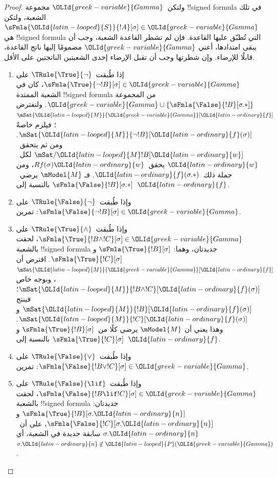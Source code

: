 \documentclass[../../../include/open-logic-section]{subfiles}
\begin{document}
\begin{proof}
ولتكن~$\OLId{greek-variable}{Gamma}$ مجموعة !!{signed formula} في تلك الشعبة، ولتكن
$\sFmla{\OLId{latin-looped}{S}}{!A}[\sigma] \in \OLId{greek-variable}{Gamma}$ هي !!{signed formula} التي تُطبّق
عليها القاعدة. فإن لم تشطر القاعدة الشعبة، وجب أن يبقى امتدادها، أعني
$\OLId{greek-variable}{Gamma}$ مضمومًا إليها ناتج القاعدة، قابلًا للإرضاء. وإن شطرتها وجب أن
تقبل الإرضاء إحدى الشعبتين الناتجتين على الأقل.
\begin{enumerate}
\item إذا طُبقت~$\TRule{\True}{\lnot}$ على
  $\sFmla{\True}{\lnot !B}[\sigma] \in \OLId{greek-variable}{Gamma}$، كان في الشعبة
  الممتدة !!{signed formula} من المجموعة
  $\OLId{greek-variable}{Gamma} \cup \{\sFmla{\False}{!B}[\sigma.{*}]\}$. ولنفترض
  $\mSat{\OLId{latin-looped}{M}}{\OLId{greek-variable}{Gamma}}[\OLId{latin-ordinary}{f}]$؛ فيلزم خاصةً
  $\mSat{\OLId{latin-looped}{M}}{\lnot !B}[\OLId{latin-ordinary}{f}(\sigma)]$. ومن ثم يتحقق~$\mSat/{\OLId{latin-looped}{M}}{!B}[\OLId{latin-ordinary}{w}]$
  لكل~$\OLId{latin-ordinary}{w}$ يحقق~$Rf(\sigma)\OLId{latin-ordinary}{w}$، ومن جملة ذلك~$\OLId{latin-ordinary}{f}(\sigma.{*})$. فـ
  $\mModel{M}$ يرضي~$\sFmla{\False}{!B}[\sigma.{*}]$ بالنسبة إلى~$\OLId{latin-ordinary}{f}$.
\item وإذا طُبقت~$\TRule{\False}{\lnot}$ على
  $\sFmla{\False}{\lnot !B}[\sigma] \in \OLId{greek-variable}{Gamma}$: تمرين.
\item وإذا طُبقت~$\TRule{\True}{\land}$ على
  $\sFmla{\True}{!B \land !C}[\sigma] \in \OLId{greek-variable}{Gamma}$، لحقت بالشعبة
  !!{signed formula} جديدتان، وهما:
  $\sFmla{\True}{!B}[\sigma]$ و$\sFmla{\True}{!C}[\sigma]$. افترض أن
  $\mSat{\OLId{latin-looped}{M}}{\OLId{greek-variable}{Gamma}}[\OLId{latin-ordinary}{f}]$، وبوجه خاص
  $\mSat{\OLId{latin-looped}{M}}{!B \land !C}[\OLId{latin-ordinary}{f}(\sigma)]$؛ فينتج
  $\mSat{\OLId{latin-looped}{M}}{!B}[\OLId{latin-ordinary}{f}(\sigma)]$ و$\mSat{\OLId{latin-looped}{M}}{!C}[\OLId{latin-ordinary}{f}(\sigma)]$. وهذا يعني أن
  $\mModel{M}$ يرضي كلًا من~$\sFmla{\True}{!B}[\sigma]$
  و$\sFmla{\True}{!C}[\sigma]$ بالنسبة إلى~$\OLId{latin-ordinary}{f}$.
\item وإذا طُبقت~$\TRule{\False}{\lor}$ على
  $\sFmla{\False}{!B \lor !C}[\sigma] \in \OLId{greek-variable}{Gamma}$: تمرين.
\item وإذا طُبقت~$\TRule{\False}{\lif}$ على
  $\sFmla{\False}{!B \lif !C}[\sigma] \in \OLId{greek-variable}{Gamma}$، لحقت بالشعبة
  !!{signed formula} جديدتان:
  $\sFmla{\True}{!B}[\sigma.\OLId{latin-ordinary}{n}]$ و$\sFmla{\False}{!C}[\sigma.\OLId{latin-ordinary}{n}]$،
  على أن~$\sigma.\OLId{latin-ordinary}{n}$ سابقة جديدة في الشعبة، أي
  $\sigma.\OLId{latin-ordinary}{n} \notin \OLId{latin-looped}{P}(\OLId{greek-variable}{Gamma})$.


\end{enumerate}
\end{proof}
\end{document}
